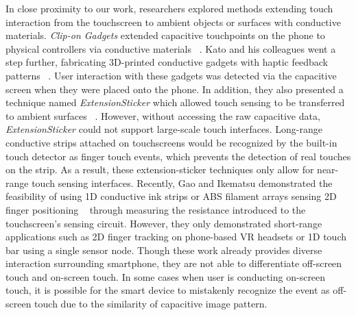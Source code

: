 In close proximity to our work, researchers explored methods extending touch interaction from the touchscreen to ambient objects or surfaces with conductive materials. \textit{Clip-on Gadgets} extended capacitive touchpoints on the phone to physical controllers via conductive materials ~\cite{Yu2011}. Kato and his colleagues went a step further, fabricating 3D-printed conductive gadgets with haptic feedback patterns ~\cite{Kato2016}. User interaction with these gadgets was detected via the capacitive screen when they were placed onto the phone. In addition, they also presented a technique named \textit{ExtensionSticker} which allowed touch sensing to be transferred to ambient surfaces ~\cite{Kato2015, Kato2015a}. However, without accessing the raw capacitive data, \textit{ExtensionSticker} could not support large-scale touch interfaces. Long-range conductive strips attached on touchscreens would be recognized by the built-in touch detector as finger touch events, which prevents the detection of real touches on the strip. As a result, these extension-sticker techniques only allow for near-range touch sensing interfaces. Recently, Gao and Ikematsu demonstrated the feasibility of using 1D conductive ink strips or ABS filament arrays sensing 2D finger positioning ~\cite{mobicom-gao18, Ikematsu-Ohmic-Touch} through measuring the resistance introduced to the touchscreen's sensing circuit. However, they only demonstrated short-range applications such as 2D finger tracking on phone-based VR headsets or 1D touch bar using a single sensor node. Though these work already provides diverse interaction surrounding smartphone, they are not able to differentiate off-screen touch and on-screen touch. In some cases when user is conducting on-screen touch, it is possible for the smart device to mistakenly recognize the event as off-screen touch due to the similarity of capacitive image pattern.

